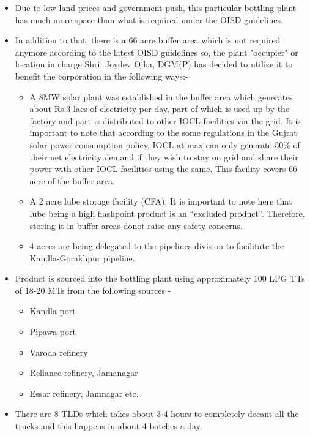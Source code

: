 \documentclass{report}
\begin{document}
	\begin{itemize}
		\item Due to low land prices and government push, this particular bottling plant has much more space than what is required under the OISD guidelines.
		\item In addition to that, there is a 66 acre buffer area which is not required anymore according to the latest OISD guidelines so, the plant "occupier" or location in charge Shri. Joydev Ojha, DGM(P) has decided to utilize it to benefit the corporation in the following ways:-
		\begin{itemize}
			\item A 8MW solar plant was established in the buffer area which generates about Rs.3 lacs of electricity per day, part of which is used up by the factory and part is distributed to other IOCL facilities via the grid. It is important to note that according to the some regulations in the Gujrat solar power consumption policy, IOCL at max can only generate 50\% of their net electricity demand if they wish to stay on grid and share their power with other IOCL facilities using the same. This facility covers 66 acre of the buffer area. 
			
			\item  A 2 acre lube storage facility (CFA). It is important to note here that lube being a high flashpoint product is an ``excluded product''. Therefore, storing it in buffer areas donot raise any safety concerns.
			
			\item 4 acres are being delegated to the pipelines division to facilitate the Kandla-Gorakhpur pipeline.
			
			
		\end{itemize}
		\item Product is sourced into the bottling plant using approximately 100 LPG TTs of 18-20 MTs from the following sources -
		\begin{itemize}
			\item Kandla port
			\item Pipawa port
			\item Varoda refinery
			\item Reliance refinery, Jamanagar
			\item Essar refinery, Jamnagar etc.
		\end{itemize}
	
		\item There are 8 TLDs which takes about 3-4 hours to completely decant all the trucks and this happens in about 4 batches a day.
		

\end{itemize}
\end{document}
